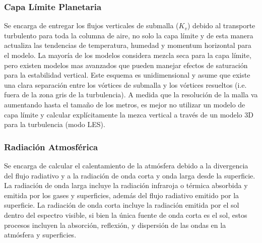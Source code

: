 \subsubsection{Capa Límite Planetaria}
Se encarga de entregar los flujos verticales de submalla ($K_v$) debido al transporte turbulento para toda la columna de aire, no solo la capa límite y de esta manera actualiza las tendencias de temperatura, humedad y momentum horizontal para el modelo. La mayoría de los modelos considera mezcla seca para la capa límite, pero existen modelos mas avanzados que pueden manejar efectos de saturación para la estabilidad vertical. Este esquema es unidimensional y asume que existe una clara separación entre los vórtices de submalla y los vórtices resueltos (i.e. fuera de la zona gris de la turbulencia). A medida que la resolución de la malla va aumentando hasta el tamaño de los metros, es mejor no utilizar un modelo de capa límite y calcular explícitamente la mezca vertical a través de un modelo 3D para la turbulencia (modo LES).
\subsubsection{Radiación Atmosférica}
Se encarga de calcular el calentamiento de la atmósfera debido a la divergencia del flujo radiativo y a la radiación de onda corta y onda larga desde la superficie. La radiación de onda larga incluye la radiación infraroja o térmica absorbida y emitida por los gases y superficies, además del flujo radiativo emitido por la superficie. La radiación de onda corta incluye la radiación emitida por el sol dentro del espectro visible, si bien la única fuente de onda corta es el sol, estos procesos incluyen la absorción, reflexión, y dispersión de las ondas en la atmósfera y superficies.

\newpage
